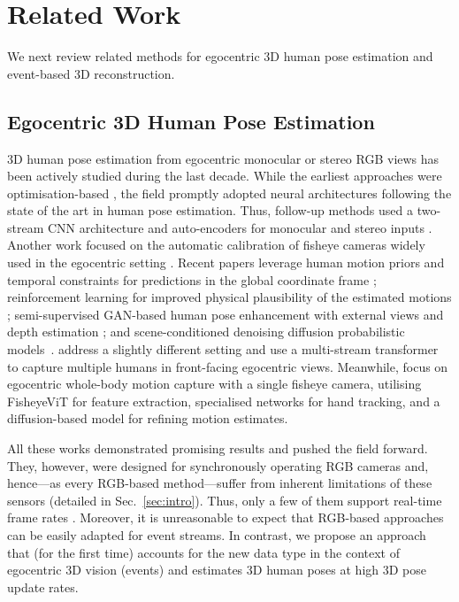 \section{Related Work}
\label{sec:related_work} 
We next review related methods for egocentric 3D human pose estimation and event-based 3D reconstruction. 

\subsection{Egocentric 3D Human Pose Estimation}
3D human pose estimation from egocentric monocular or stereo RGB views has been actively studied during the last decade. 
While the earliest approaches were optimisation-based \citep{rhodin2016egocap}, the field promptly adopted neural architectures following the state of the art in human pose estimation. 
Thus, follow-up methods used a two-stream CNN architecture \citep{xu2019mo2cap2} and auto-encoders for monocular \citep{tome2019xr, Tom2023SelfPose3E} and stereo inputs \citep{zhao2021egoglass, hakada2022unrealego,hakada2024unrealego2,Kang2023Ego3DPose}. 
Another work focused on the automatic calibration of fisheye cameras widely used in the egocentric setting \citep{zhang2021automatic}. 
Recent papers leverage human motion priors and temporal constraints for predictions in the global coordinate frame \citep{wang2021estimating}; reinforcement learning for improved physical plausibility of the estimated motions \citep{yuan2019ego, luo2021dynamics}; semi-supervised GAN-based human pose enhancement with external views \citep{wang2022estimating} and depth estimation \citep{wang2023scene}; and scene-conditioned denoising diffusion probabilistic models~\citep{Zhang_2023_ICCV}. 
%
\citet{Khirodkar_2023_ICCV} address a slightly different setting and use a multi-stream transformer to capture multiple humans in front-facing egocentric views. 
%
Meanwhile, \citet{wang2024egocentric} focus on egocentric whole-body motion capture with a single fisheye camera, utilising FisheyeViT for feature extraction, specialised networks for hand tracking, and a diffusion-based model for refining motion estimates.


All these works demonstrated promising results and pushed the field forward. 
They, however, were designed for synchronously operating RGB cameras and, hence---as every RGB-based method---suffer from inherent limitations of these sensors (detailed in Sec.~\ref{sec:intro}). 
Thus, only a few of them support real-time frame rates \citep{xu2019mo2cap2, tome2019xr}. 
Moreover, it is unreasonable to expect that RGB-based approaches can be easily adapted for event streams. 
In contrast, we propose an approach 
that (for the first time) accounts for the new data type in the context of egocentric 3D vision (events) and estimates 3D human poses at high 3D pose update rates. 

